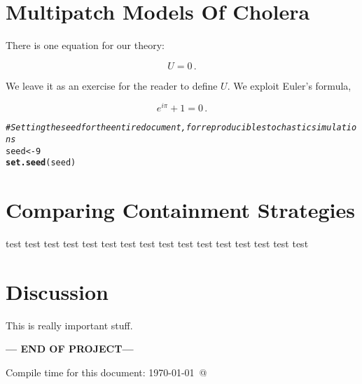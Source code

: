 \documentclass[12pt]{article}\usepackage[]{graphicx}\usepackage[]{color}
\makeatletter
\newcommand{\hlnum}[1]{\textcolor[rgb]{0.686,0.059,0.569}{#1}}%
\newcommand{\hlcom}[1]{\textcolor[rgb]{0.678,0.584,0.686}{\textit{#1}}}%
\newcommand{\hlstd}[1]{\textcolor[rgb]{0.345,0.345,0.345}{#1}}%
\newcommand{\hlkwb}[1]{\textcolor[rgb]{0.69,0.353,0.396}{#1}}%
\newcommand{\hlkwd}[1]{\textcolor[rgb]{0.737,0.353,0.396}{\textbf{#1}}}%
\newenvironment{kframe}{%
 \def\at@end@of@kframe{}%
 \ifinner\ifhmode%
  \def\at@end@of@kframe{\end{minipage}}%
  \begin{minipage}{\columnwidth}%
 \fi\fi%
 \def\FrameCommand##1{\hskip\@totalleftmargin \hskip-\fboxsep
 \colorbox{shadecolor}{##1}\hskip-\fboxsep
     \hskip-\linewidth \hskip-\@totalleftmargin \hskip\columnwidth}%
 \MakeFramed {\advance\hsize-\width
   \@totalleftmargin\z@ \linewidth\hsize
   \@setminipage}}%
 {\par\unskip\endMakeFramed%
 \at@end@of@kframe}
\newenvironment{knitrout}{}{} %
\makeatother
\begin{document}
\section{Multipatch Models Of Cholera}
There is one equation for our theory:
\begin{linenomath*}
\begin{equation}\label{E:U}
U = 0 \,.
\end{equation}
\end{linenomath*}
We leave it as an exercise for the reader to define $U$.
We exploit Euler's formula,
\begin{linenomath*}
\begin{equation}\label{E:Euler}
e^{i\pi} + 1 = 0 \,.
\end{equation}
\end{linenomath*}
\begin{knitrout}
\color{fgcolor}\begin{kframe}
\begin{alltt}
\hlcom{#Setting the seed for the entire document, for reproducible stochastic simulations}
\hlstd{seed} \hlkwb{<-} \hlnum{9}
\hlkwd{set.seed}\hlstd{(seed)}
\end{alltt}
\end{kframe}
\end{knitrout}

\section{Comparing Containment Strategies}
test \cite{link1}
test \cite{link2}
test \cite{link3}
test \cite{link4}
test \cite{link5}
test \cite{link6}
test \cite{link7}
test \cite{link8}
test \cite{link9}
test \cite{link10}
test \cite{link11}
test \cite{link12}
test \cite{link13}
test \cite{link14}
test \cite{link15}
test \cite{link16}


\section{Discussion}
This is really important stuff.

\bigskip\vfill
\centerline{\bf--- END OF PROJECT---}
\bigskip
Compile time for this document:
\today\ @ \thistime
\printbibliography
\end{document}
